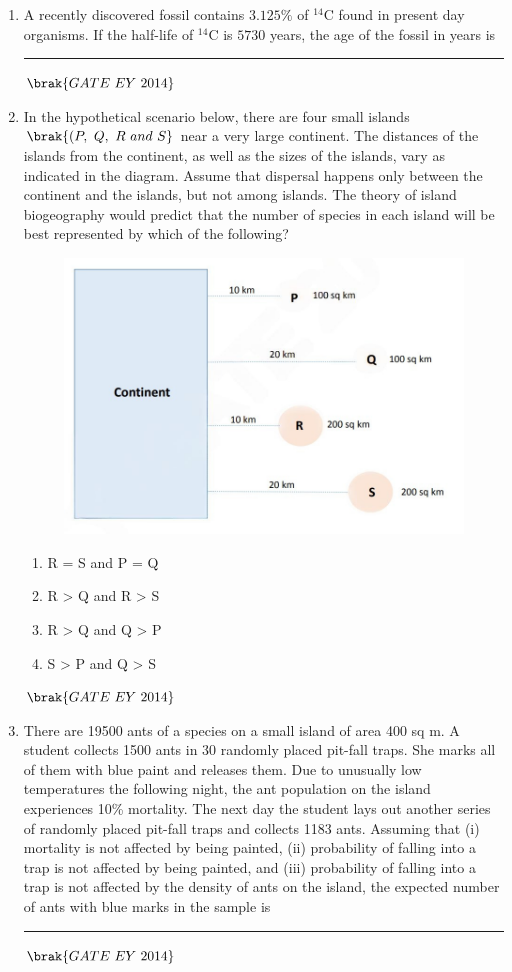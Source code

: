 \documentclass[journal]{IEEEtran}
\numberwithin{equation}{enumi}
\numberwithin{figure}{enumi}
\begin{document}
\begin{enumerate}
    \item A recently discovered fossil contains $3.125\%$ of $^{14}$C found in present day organisms. If the half-life of $^{14}$C is $5730$ years, the age of the fossil in years is \rule{3cm}{0.15mm}
    \hfill{$\brak{ GATE\ EY\ 2014}$}
    \bigskip
    
    \item In the hypothetical scenario below, there are four small islands $\brak{(P,\ Q,\ R\ and\ S}$ near a very large continent. The distances of the islands from the continent, as well as the sizes of the islands, vary as indicated in the diagram. Assume that dispersal happens only between the continent and the islands, but not among islands. The theory of island biogeography would predict that the number of species in each island will be best represented by which of the following?
    \begin{figure}[H]
    \centering
    \includegraphics[width=0.7\columnwidth]{figs/14.png}
    \caption{}
    \label{fig:14}
   \end{figure}
    \begin{multicols}{2}
    \begin{enumerate}
        \item R = S and P = Q
        \item R > Q and R > S
        \item R > Q and Q > P
        \item S > P and Q > S
    \end{enumerate}
    \end{multicols}
    \hfill{$\brak{ GATE\ EY\ 2014}$}
    \bigskip
    
    \item There are 19500 ants of a species on a small island of area 400 sq m. A student collects 1500 ants in 30 randomly placed pit-fall traps. She marks all of them with blue paint and releases them. Due to unusually low temperatures the following night, the ant population on the island experiences 10\% mortality. The next day the student lays out another series of randomly placed pit-fall traps and collects 1183 ants. Assuming that (i) mortality is not affected by being painted, (ii) probability of falling into a trap is not affected by being painted, and (iii) probability of falling into a trap is not affected by the density of ants on the island, the expected number of ants with blue marks in the sample is \rule{3cm}{0.15mm}
    \hfill{$\brak{ GATE\ EY\ 2014}$}
    \bigskip
    

\end{enumerate}
\end{document}
